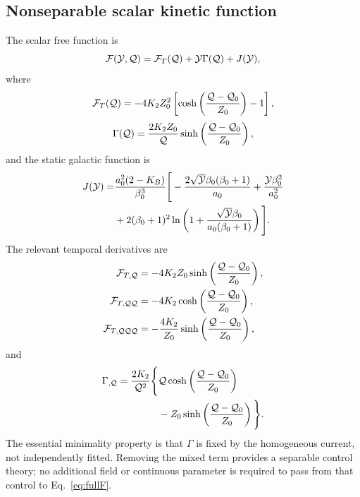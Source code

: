 \subsection{Nonseparable scalar kinetic function}
The scalar free function is
\begin{equation}
\mathcal{F}(\mathcal{Y},\mathcal{Q})=\mathcal{F}_{T}(\mathcal{Q})+\mathcal{Y}\Gamma(\mathcal{Q})+J(\mathcal{Y}),
\label{eq:fullF}
\end{equation}
where
\begin{equation}
\mathcal{F}_{T}(\mathcal{Q})=-4K_2Z_0^2\left[\cosh\left(\frac{\mathcal{Q}-\mathcal{Q}_0}{Z_0}\right)-1\right],
\label{eq:FT}
\end{equation}
\begin{equation}
\Gamma(\mathcal{Q})=\frac{2K_2Z_0}{\mathcal{Q}}\sinh\left(\frac{\mathcal{Q}-\mathcal{Q}_0}{Z_0}\right),
\label{eq:Gamma}
\end{equation}
and the static galactic function is
\begin{align}
J(\mathcal{Y})=&\frac{a_0^2(2-K_B)}{\beta_0^3}\Bigg[-\frac{2\sqrt{\mathcal{Y}}\beta_0(\beta_0+1)}{a_0}
+\frac{\mathcal{Y}\beta_0^2}{a_0^2}\nonumber\\
&+2(\beta_0+1)^2\ln\left(1+\frac{\sqrt{\mathcal{Y}}\beta_0}{a_0(\beta_0+1)}\right)\Bigg].
\label{eq:JY}
\end{align}
The relevant temporal derivatives are
\begin{align}
\mathcal{F}_{T,\mathcal{Q}}&=-4K_2Z_0\sinh\left(\frac{\mathcal{Q}-\mathcal{Q}_0}{Z_0}\right),\\
\mathcal{F}_{T,\mathcal{Q}\mathcal{Q}}&=-4K_2\cosh\left(\frac{\mathcal{Q}-\mathcal{Q}_0}{Z_0}\right),\\
\mathcal{F}_{T,\mathcal{Q}\mathcal{Q}\mathcal{Q}}&=-\frac{4K_2}{Z_0}\sinh\left(\frac{\mathcal{Q}-\mathcal{Q}_0}{Z_0}\right),
\end{align}
and
\begin{align}
\Gamma_{,\mathcal{Q}}=\frac{2K_2}{\mathcal{Q}^2}\Bigg\{&\mathcal{Q}\cosh\left(\frac{\mathcal{Q}-\mathcal{Q}_0}{Z_0}\right)\nonumber\\
&-Z_0\sinh\left(\frac{\mathcal{Q}-\mathcal{Q}_0}{Z_0}\right)\Bigg\}.
\label{eq:GammaQ}
\end{align}
The essential minimality property is that $\Gamma$ is fixed by the homogeneous current, not independently fitted. Removing the mixed term provides a separable control theory; no additional field or continuous parameter is required to pass from that control to Eq.~\eqref{eq:fullF}.

